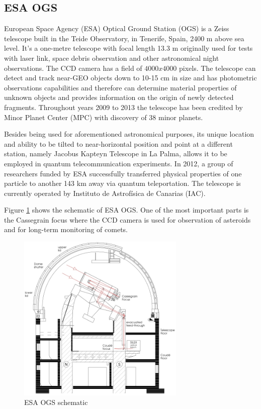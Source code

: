 \subsection{ESA OGS}\label{subsec:esa_ogs}
European Space Agency (ESA) Optical Ground Station (OGS) is a Zeiss telescope built in the Teide Observatory, in Tenerife, Spain, 2400 m above sea level. It’s a one-metre telescope with focal length 13.3 m originally used for tests with laser link, space debris observation and other astronomical night observations. The CCD camera has a field of $4000 x 4000$ pixels. The telescope can detect and track near-GEO objects down to 10-15 cm in size and has photometric observations capabilities and therefore can determine material properties of unknown objects and provides information on the origin of newly detected fragments. Throughout years 2009 to 2013 the telescope has been credited by Minor Planet Center (MPC) with discovery of 38 minor planets.
 
	Besides being used for aforementioned astronomical purposes, its unique location and ability to be tilted to near-horizontal position and point at a different station, namely Jacobus Kapteyn Telescope in La Palma, allows it to be employed in quantum telecommunication experiments. In 2012, a group of researchers funded by ESA successfully transferred physical properties of one particle to another 143 km away via quantum teleportation. The telescope is currently operated by Instituto de Astrofísica de Canarias (IAC).

	Figure \ref{fig:esaogs1} shows the schematic of ESA OGS. One of the most important parts is the Cassegrain focus where the CCD camera is used for observation of asteroids and for long-term monitoring of comets.


\begin{figure}[H]
\centering
  \includegraphics[width=8cm]{images/ESAOGS1}
  \caption{ESA OGS schematic}
  \label{fig:esaogs1}
\end{figure}

